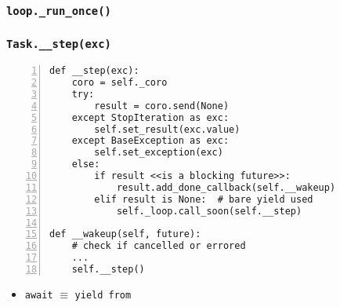 \documentclass[compress,usenames,dvipsnames]{beamer}
\begin{document}
\begin{frame}[plain]
    \frametitle{\lstinline{loop._run_once()}}
    \begin{algorithm}[H]
        \SetAlgoNoEnd
        \DontPrintSemicolon
    \end{algorithm}
\end{frame}

\begin{frame}
    \frametitle{\lstinline{Task.__step(exc)}}
    \scriptsize
    \begin{lstlisting}[numbers=left]
def __step(exc):
    coro = self._coro
    try:
        result = coro.send(None)
    except StopIteration as exc:
        self.set_result(exc.value)
    except BaseException as exc:
        self.set_exception(exc)
    else:
        if result <<is a blocking future>>:
            result.add_done_callback(self.__wakeup)
        elif result is None:  # bare yield used
            self._loop.call_soon(self.__step)

def __wakeup(self, future):
    # check if cancelled or errored
    ...
    self.__step()
    \end{lstlisting}

\begin{itemize}
    \item {\lstinline{await}} $\equiv$ {\lstinline{yield from}}
\end{itemize}
\end{frame}
\end{document}
